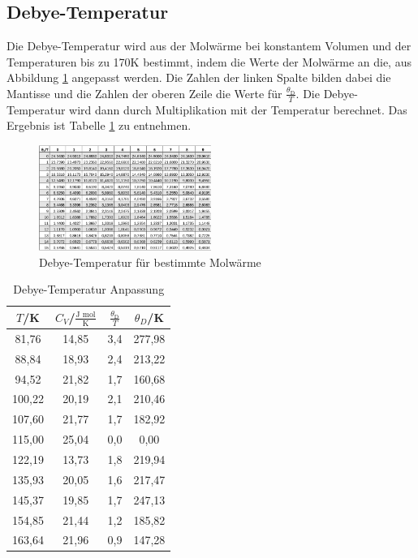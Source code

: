 \subsection{Debye-Temperatur}
Die Debye-Temperatur wird aus der Molwärme bei konstantem Volumen und der Temperaturen bis zu 170K bestimmt, indem die Werte der Molwärme an die, aus Abbildung \ref{fig:abb3} angepasst werden. Die Zahlen der linken Spalte bilden dabei die Mantisse und die Zahlen der oberen Zeile die Werte für \(\frac{\theta_\text{D}}{T}\). Die Debye-Temperatur wird dann durch Multiplikation mit der Temperatur berechnet. Das Ergebnis ist Tabelle \ref{fig:tab4} zu entnehmen.

\begin{figure}
	\centering
		\includegraphics[width=0.5\textwidth]{debye.png}
	\caption{Debye-Temperatur für bestimmte Molwärme}
	\label{fig:abb3}
\end{figure}

\begin{table}[H]
	\begin{center}
		\begin{tabular}{c c c c}
			\toprule
			\(T\)/K & \(C_V\)/\(\frac{\text{J mol}}{\text{K}}\) & \(\frac{\theta_\text{D}}{T}\) & \(\theta_D\)/K \\
			\midrule
			81,76	&14,85	&3,4		&277,98\\
			88,84	&18,93	&2,4		&213,22\\
			94,52	&21,82	&1,7		&160,68\\
			100,22	&20,19	&2,1		&210,46\\
			107,60	&21,77	&1,7		&182,92\\
			115,00	&25,04	&0,0		&0,00\\
			122,19	&13,73	&1,8		&219,94\\
			135,93	&20,05	&1,6		&217,47\\
			145,37	&19,85	&1,7		&247,13\\
			154,85	&21,44	&1,2		&185,82\\
			163,64	&21,96	&0,9		&147,28\\
			\bottomrule
		\end{tabular}
		\caption{Debye-Temperatur Anpassung}
		\label{fig:tab4}
	\end{center}
\end{table}


